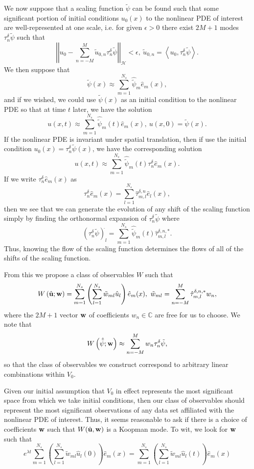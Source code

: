\documentclass[a4paper,11pt]{article}
\newcommand{\gnorm}[1]{\left|\left| #1\right|\right|}
\begin{document}
We now suppose that a scaling function $\tilde{\psi}$ can be found such that some significant portion of initial conditions $u_{0}(x)$ to the nonlinear PDE of interest are well-represented at one scale, i.e. for given $\epsilon > 0$  there exist $2M+1$ modes $\tau^{\delta }_{n}\tilde{\psi}$ such that 
\[
\gnorm{u_{0} - \sum_{n=-M}^{M}\tilde{u}_{0,n}\tau^{\delta}_{n}\tilde{\psi}}_{\mathcal{H}} < \epsilon, ~ \tilde{u}_{0,n} = \left<u_{0}, \tau^{\delta}_{n}\tilde{\psi}\right>. 
\]
We then suppose that 
\[
\tilde{\psi}(x) \approx \sum_{m=1}^{N_{s}}\hat{\tilde{\psi}}_{m}\hat{e}_{m}(x),
\]
and if we wished, we could use $\tilde{\psi}(x)$ as an initial condition to the nonlinear PDE so that at time $t$ later, we have the solution 
\[
u(x,t) \approx \sum_{m=1}^{N_{s}}\hat{\tilde{\psi}}_{m}(t)\hat{e}_{m}(x), ~ u(x,0) = \tilde{\psi}(x).
\]
If the nonlinear PDE is invariant under spatial translation, then if use the initial condition $u_{0}(x) = \tau_{n}^{\delta}\tilde{\psi}(x)$, we have the corresponding solution 
\[
u(x,t) \approx \sum_{m=1}^{N_{s}} \hat{\tilde{\psi}}_{m}(t)\tau_{n}^{\delta}\hat{e}_{m}(x).
\]
If we write $\tau_{n}^{\delta}\hat{e}_{m}(x)$ as 
\[
\tau_{n}^{\delta}\hat{e}_{m}(x) = \sum_{l=1}^{N_{s}}\hat{\tau}^{\delta,n}_{m,l}\hat{e}_{l}(x),
\]
then we see that we can generate the evolution of any shift of the scaling function simply by finding the orthonormal expansion of $\tau_{n}^{\delta}\tilde{\psi}$ where 
\[
\left(\tau^{\delta}_{n}\tilde{\psi}\right)^{\hat{}}_{l} = \sum_{m=1}^{N_{s}}\hat{\tilde{\psi}}_{m}(t)\hat{\tau}^{\delta,n,\ast}_{m,l}.
\]
Thus, knowing the flow of the scaling function determines the flows of all of the shifts of the scaling function.  

From this we propose a class of observables $W$ such that 
\[
W\left(\hat{{\bf u}} ; {\bf w}\right) = \sum_{m=1}^{N_{s}}\left(\sum_{l=1}^{N_{s}}\tilde{w}_{ml}\hat{u}_{l}\right)\hat{e}_{m}(x), ~ \tilde{w}_{ml} = \sum_{n=-M}^{M}\hat{\tau}^{\delta,n,\ast}_{m,l}w_{n},
\]
where the $2M+1$ vector ${\bf w}$ of coefficients $w_{n}\in \mathbb{C}$ are free for us to choose.  We note that 
\[
W\left(\hat{\tilde{\psi}} ; {\bf w}\right) \approx \sum_{n=-M}^{M} w_{n}\tau_{n}^{\delta}\tilde{\psi},
\]
so that the class of observables we construct correspond to arbitrary linear combinations within $V_{0}$.  

Given our initial assumption that $V_{0}$ in effect represents the most significant space from which we take initial conditions, then our class of observables should represent the most significant observations of any data set affiliated with the nonlinear PDE of interest.  Thus, it seems reasonable to ask if there is a choice of coefficients ${\bf w}$ such that $W(\hat{{\bf u}},{\bf w})$ is a Koopman mode.  To wit, we look for ${\bf w}$ such that
\[
e^{\lambda t} \sum_{m=1}^{N_{s}}\left(\sum_{l=1}^{N_{s}}\tilde{w}_{ml}\hat{u}_{l}(0)\right)\hat{e}_{m}(x) = \sum_{m=1}^{N_{s}}\left(\sum_{l=1}^{N_{s}}\tilde{w}_{ml}\hat{u}_{l}(t)\right)\hat{e}_{m}(x)
\]
\end{document}
